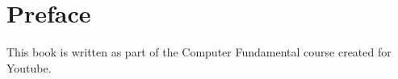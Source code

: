 \chapter*{Preface} 
{}
This book is written as part of the Computer Fundamental course created for Youtube.
